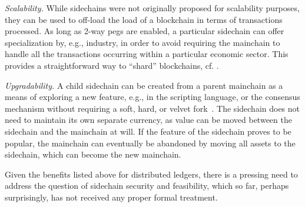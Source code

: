 {\em   Scalability.} While sidechains were not originally proposed for
    scalability purposes, they can be used to off-load the load of a blockchain
    in terms of transactions processed. As long as 2-way pegs are enabled, a
    particular sidechain can offer specialization by, e.g., industry, in order
    to avoid requiring the mainchain to handle all the transactions occurring
    within a particular economic sector. This provides a straightforward way to
    ``shard'' blockchains, cf. \cite{sharding,omniledger,rapidchain}.

{\em Upgradability.} A child sidechain can be created from a parent
    mainchain as a means of exploring a new feature, e.g., in the scripting language, or
    the consensus mechanism
    without requiring a soft, hard, or velvet fork~\cite{nipopows,velvet}. The
    sidechain does not need to maintain its own separate currency, as value can
    be moved between the sidechain and the mainchain at will. If the feature of
    the sidechain proves to be popular, the mainchain can eventually be
    abandoned by moving all assets to the sidechain, which can become the new
    mainchain.

Given the benefits listed above for distributed ledgers, there is a pressing
need to address the question of sidechain security and feasibility, which so far, perhaps surprisingly, has not received any proper formal treatment.
